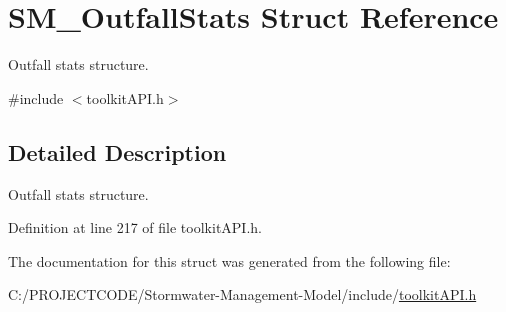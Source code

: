 \hypertarget{struct_s_m___outfall_stats}{}\section{S\+M\+\_\+\+Outfall\+Stats Struct Reference}
\label{struct_s_m___outfall_stats}


Outfall stats structure.  




{\ttfamily \#include $<$toolkit\+A\+P\+I.\+h$>$}



\subsection{Detailed Description}
Outfall stats structure. 

Definition at line 217 of file toolkit\+A\+P\+I.\+h.



The documentation for this struct was generated from the following file\+:\begin{DoxyCompactItemize}
\item 
C\+:/\+P\+R\+O\+J\+E\+C\+T\+C\+O\+D\+E/\+Stormwater-\/\+Management-\/\+Model/include/\hyperlink{toolkit_a_p_i_8h}{toolkit\+A\+P\+I.\+h}\end{DoxyCompactItemize}
